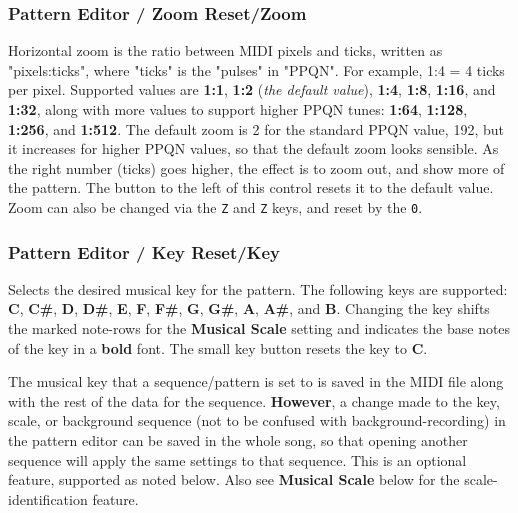 \subsubsection{Pattern Editor / Zoom Reset/Zoom}
\label{subsubsec:pattern_editor_second_row_zoom_reset}

   Horizontal zoom is the ratio between MIDI pixels and ticks, written as
   "pixels:ticks", where "ticks" is the "pulses" in "PPQN".
   For example, 1:4 = 4 ticks per pixel.
   Supported values are
   \textbf{1:1}, \textbf{1:2} (\textsl{the default value}),
   \textbf{1:4}, \textbf{1:8}, \textbf{1:16},
   and \textbf{1:32}, along with
   more values to support higher PPQN tunes:
   \textbf{1:64}, \textbf{1:128}, \textbf{1:256}, and \textbf{1:512}.
   The default zoom is 2 for the standard PPQN value, 192, but it
   increases for higher PPQN values, so that the default zoom looks sensible.
   As the right number (ticks) goes higher,
   the effect is to zoom out, and show more of the pattern.
   The button to the left of this control resets it to the default value.
   Zoom can also be changed via the \texttt{Z} and \texttt{Z} keys, and
   reset by the \texttt{0}.

\subsubsection{Pattern Editor / Key Reset/Key}
\label{subsubsec:pattern_editor_second_row_musical_key}

   Selects the desired musical key for the pattern.  The following keys are
   supported:
   \textbf{C}, \textbf{C\#},
   \textbf{D}, \textbf{D\#},
   \textbf{E}, \textbf{F}, \textbf{F\#},
   \textbf{G}, \textbf{G\#},
   \textbf{A}, \textbf{A\#},
   and \textbf{B}.
   Changing the key shifts the marked note-rows
   for the \textbf{Musical Scale} setting and indicates the base notes
   of the key in a \textbf{bold} font.
   The small key button resets the key to \textbf{C}.

   The musical key that a sequence/pattern is set to is
   saved in the MIDI file along with the rest of the data for the sequence.
   \textbf{However},
   a change made to the key, scale,
   or background sequence (not to be confused with background-recording)
   in the pattern editor can be saved in the whole song,
   so that opening another sequence
   will apply the same settings to that sequence.  This is an optional feature,
   supported as noted below.
   Also see \textbf{Musical Scale} below for the scale-identification feature.


